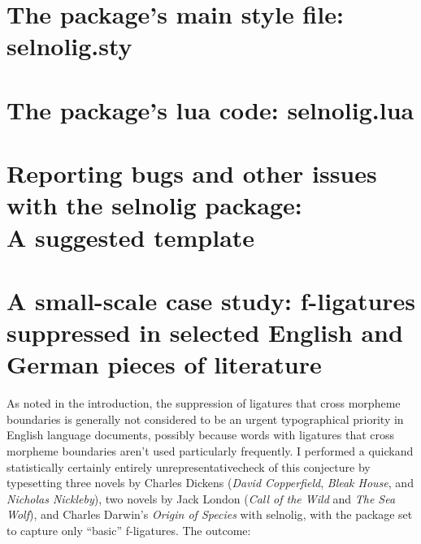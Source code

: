 \documentclass[11pt]{article}
\newcommand{\pkg}[1]{\textsf{#1}}
\begin{document}
\bigskip

\begin{multicols}{2}
\end{multicols}

\clearpage
\section[The package's main style file: selnolig.sty]
{The package's main style file: \pkg{selnolig.sty}}
\label{sec:sty}


\clearpage
\section[The package's lua code: selnolig.lua]{The package's lua code: \pkg{selnolig.lua}}
\label{sec:luacode}


\clearpage

\section[Reporting bugs and other issues with the selnolig package: A suggested template]{Reporting bugs and other issues with the \pkg{selnolig} package:\\A suggested template} \label{sec:template}


\clearpage
\selnoligon
\section{A small-scale case study: f-ligatures suppressed in selected English and German pieces of literature} \label{sec:budd}

As noted in the introduction, the suppression of ligatures that cross morpheme boundaries is generally not considered to be an urgent typographical priority in English language documents, possibly because words with ligatures that cross morpheme boundaries aren't used particularly frequently. I performed a quick\textemdash and statistically certainly entirely unrepresentative\textemdash check of this conjecture by typesetting three novels by Charles Dickens (\emph{\ebg David Copperfield}, \emph{\ebg Bleak House}, and \emph{\ebg Nicholas Nickleby}), two novels by Jack London (\emph{\ebg Call of the Wild} and \emph{\ebg The Sea Wolf}), and Charles Darwin's \emph{\ebg Origin of Species} with \pkg{selnolig}, with the package set to capture only \enquote{basic} f-ligatures. The outcome:
\end{document}
